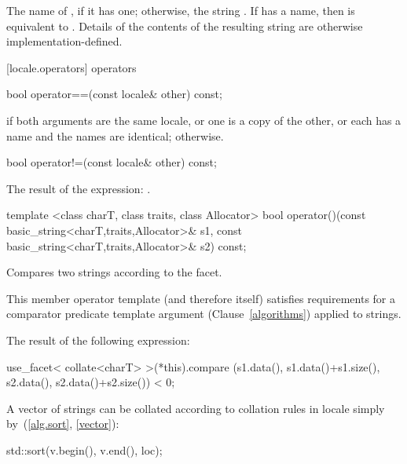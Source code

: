 \begin{itemdescr}
\pnum
\returns
The name of
,
if it has one; otherwise, the string .
If
has a name, then
is equivalent to
.
Details of the contents of the resulting string are otherwise implementation-defined.%
\end{itemdescr}

[locale.operators]{ operators}

%
\begin{itemdecl}
bool operator==(const locale& other) const;
\end{itemdecl}

\begin{itemdescr}
\pnum
\returns
{}
if both arguments are the same locale, or one is a copy of the
other, or each has a name and the names are identical;
otherwise.
\end{itemdescr}

%
\begin{itemdecl}
bool operator!=(const locale& other) const;
\end{itemdecl}

\begin{itemdescr}
\pnum
\returns
The result of the expression:
.
\end{itemdescr}

%
\begin{itemdecl}
template <class charT, class traits, class Allocator>
  bool operator()(const basic_string<charT,traits,Allocator>& s1,
                  const basic_string<charT,traits,Allocator>& s2) const;
\end{itemdecl}

\begin{itemdescr}
\pnum
\effects
Compares two strings according to the
facet.

\pnum
\remarks
This member operator template (and therefore
itself) satisfies requirements for a comparator predicate template argument
(Clause~\ref{algorithms}) applied to strings.

\pnum
\returns
The result of the following expression:

\begin{codeblock}
use_facet< collate<charT> >(*this).compare
  (s1.data(), s1.data()+s1.size(), s2.data(), s2.data()+s2.size()) < 0;
\end{codeblock}

\pnum
\begin{example}
A vector of strings
can be collated according to collation rules in locale
simply by~(\ref{alg.sort}, \ref{vector}):

\begin{codeblock}
std::sort(v.begin(), v.end(), loc);
\end{codeblock}
\end{example}
\end{itemdescr}

